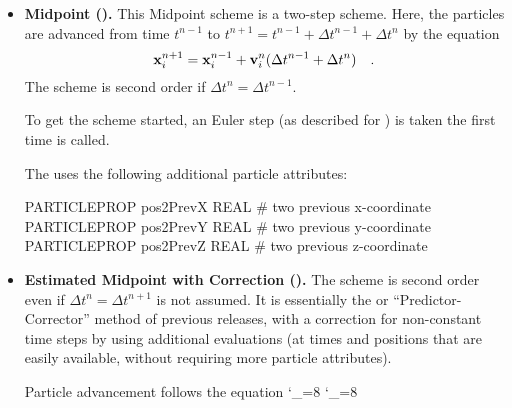 \begin{itemize}
\item{\textbf{Midpoint ().}}
This Midpoint scheme is a two-step scheme.  Here, the particles are advanced from time
 $t^{n-1}$ to $t^{n+1} = t^{n-1} + \Delta t^{n-1} + \Delta t^{n}$ by the equation
     \begin{equation}
      {\bf x}_i^{n+1} = {\bf x}_i^{n-1} + {\bf v}_i^{n}(\Delta t^{n-1} + \Delta t^{n}) \quad.
      \end{equation}
The scheme is second order if $\Delta t^n = \Delta t^{n-1}$.

To get the scheme started, an Euler step (as described for ) is taken the first time 
 is called.

The  \childunit uses the following additional particle attributes:
\begin{codeseg}
PARTICLEPROP pos2PrevX REAL           # two previous x-coordinate
PARTICLEPROP pos2PrevY REAL           # two previous y-coordinate
PARTICLEPROP pos2PrevZ REAL           # two previous z-coordinate
\end{codeseg}




\item{\textbf{Estimated Midpoint with Correction ().}}
The scheme is second order even if $\Delta t^n = \Delta t^{n+1}$ is not assumed.
It is essentially the  or ``Predictor-Corrector'' method of
previous releases, with a correction for 
non-constant time steps
by using additional evaluations (at times and positions
that are easily available, without requiring more particle attributes).

Particle advancement follows the equation
\catcode`\_=8\relax
\newcommand{\XP}{\textbf{xp(t+1.5*dtNew)}}
\newcommand{\VP}{\textbf{vp(t+1.5*dtNew)}}
\newcommand{\Deltat}{{\Delta t}}
\catcode`\_=8
\newcommand{\xn}{{\bf x}_i^{n}}
\newcommand{\vn}{{\bf v}_i^{n}}
\newcommand{\tn}{t^{n}}
\newcommand{\tp}{t_{*}^{n+\frac12}}
\newcommand{\tP}{t^n + \Deltatp }
\newcommand{\thalf}{t^{n+\frac12}}
\newcommand{\tH}{t^n + \frac12 \Delta t^{n} }
\newcommand{\Deltatp}{\Delta t_{*}^{n} }
\newcommand{\DeltatP}{\frac12 \Delta t^{n-1} }
\newcommand{\Deltathalf}{\frac12 \Delta t^{n}}
\newcommand{\xh}{{\bf x}_i^{{\mathrm{E}},n+\frac12}}
\newcommand{\xp}{{\bf x}_i^{*,n+\frac12}}
\newcommand{\vp}{{\bf v}_i^{*,n+\frac12}}
\newcommand{\vcomb}{{\bf v}_i^{\mathrm{comb}}}
\newcommand{\CA}{c_1(\Deltat^{n-1},\Deltat^n)}
\newcommand{\CB}{c_2(\Deltat^{n-1},\Deltat^n)}
\newcommand{\CC}{c_3(\Deltat^{n-1},\Deltat^n)}
\newcommand{\CD}{c_4(\Deltat^{n-1},\Deltat^n)}
\newcommand{\cA}{c_1}
\newcommand{\cB}{c_2}
\newcommand{\cC}{c_3}
\newcommand{\cD}{c_4}


\end{itemize}
